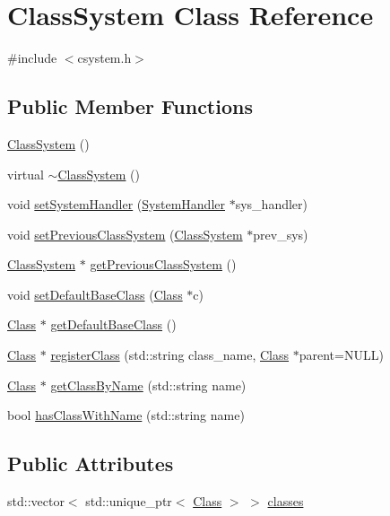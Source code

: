 \hypertarget{classClassSystem}{}\section{Class\+System Class Reference}
\label{classClassSystem}


{\ttfamily \#include $<$csystem.\+h$>$}

\subsection*{Public Member Functions}
\begin{DoxyCompactItemize}
\item 
\hyperlink{classClassSystem_aaaec70fea8c72ed8c47bfb4de3fc4b46}{Class\+System} ()
\item 
virtual \hyperlink{classClassSystem_a9b1842899a13f28ca47cf24287dc0616}{$\sim$\+Class\+System} ()
\item 
void \hyperlink{classClassSystem_abe7eb559b5291d324cb055c89e80b180}{set\+System\+Handler} (\hyperlink{classSystemHandler}{System\+Handler} $\ast$sys\+\_\+handler)
\item 
void \hyperlink{classClassSystem_a8bda9472a03697e442079606aa51c4fc}{set\+Previous\+Class\+System} (\hyperlink{classClassSystem}{Class\+System} $\ast$prev\+\_\+sys)
\item 
\hyperlink{classClassSystem}{Class\+System} $\ast$ \hyperlink{classClassSystem_a32c4883e03da6a11ab11f2f39afc073a}{get\+Previous\+Class\+System} ()
\item 
void \hyperlink{classClassSystem_a10283c2e4e7cc89b213f6a32a0d709c1}{set\+Default\+Base\+Class} (\hyperlink{classClass}{Class} $\ast$c)
\item 
\hyperlink{classClass}{Class} $\ast$ \hyperlink{classClassSystem_add1ff8eadba3826024e68c836af28250}{get\+Default\+Base\+Class} ()
\item 
\hyperlink{classClass}{Class} $\ast$ \hyperlink{classClassSystem_a02f4790dd9b8fa8808a4e17f1e152281}{register\+Class} (std\+::string class\+\_\+name, \hyperlink{classClass}{Class} $\ast$parent=N\+U\+LL)
\item 
\hyperlink{classClass}{Class} $\ast$ \hyperlink{classClassSystem_a4b88087eed035dc1f6100850c933ae84}{get\+Class\+By\+Name} (std\+::string name)
\item 
bool \hyperlink{classClassSystem_aa3e6fdac5739091d3f48dbe2b8c9db46}{has\+Class\+With\+Name} (std\+::string name)
\end{DoxyCompactItemize}
\subsection*{Public Attributes}
\begin{DoxyCompactItemize}
\item 
std\+::vector$<$ std\+::unique\+\_\+ptr$<$ \hyperlink{classClass}{Class} $>$ $>$ \hyperlink{classClassSystem_afdfbb54eb10abf323371cb9bb4f639a2}{classes}
\end{DoxyCompactItemize}


